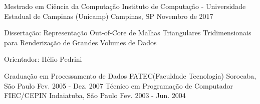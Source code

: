 \begin{cventries}
  \cventry
    {Mestrado em Ciência da Computação}
    {Instituto de Computação - Universidade Estadual de Campinas (Unicamp)}
    {Campinas, SP}
    {Novembro de 2017}
    {
      \begin{cvitems}
      \item Dissertação: Representação Out-of-Core de Malhas Triangulares Tridimensionais para Renderização de Grandes Volumes de Dados
      \item{Orientador: Hélio Pedrini}
  \end{cvitems}
}
  \cventry
    {Graduação em Processamento de Dados}
    {FATEC(Faculdade Tecnologia)}
    {Sorocaba, São Paulo}
    {Fev. 2005 - Dez. 2007}
    {}
  \cventry
  	{Técnico em Programação de Computador}
    {FIEC/CEPIN}
    {Indaiatuba, São Paulo}
    {Fev. 2003 - Jun. 2004}
    {}
\end{cventries}
